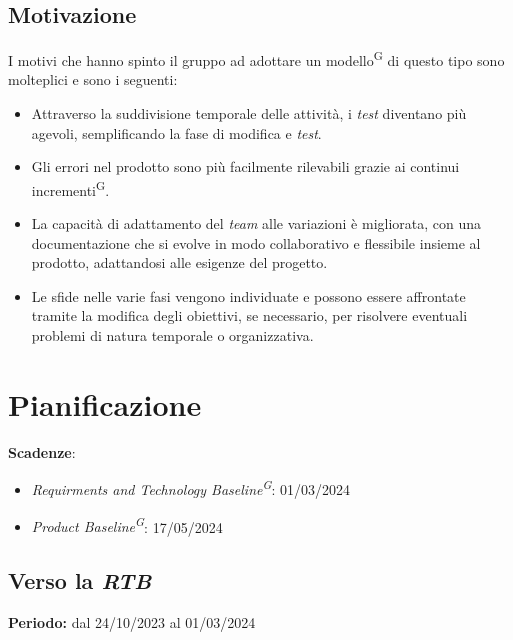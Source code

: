 \documentclass[5pt]{article}
\begin{document}
\subsection{Motivazione}
I motivi che hanno spinto il gruppo ad adottare un modello\textsuperscript{G} di questo tipo sono molteplici e sono i seguenti:
\begin{itemize}
    \item Attraverso la suddivisione temporale delle attività, i \textit{test} diventano più agevoli, semplificando la fase di modifica e \textit{test}.
    \item Gli errori nel prodotto sono più facilmente rilevabili grazie ai continui incrementi\textsuperscript{G}.
    \item La capacità di adattamento del \textit{team} alle variazioni è migliorata, con una documentazione che si evolve in modo collaborativo e flessibile insieme al prodotto, adattandosi alle esigenze del progetto.
    \item Le sfide nelle varie fasi vengono individuate e possono essere affrontate tramite la modifica degli obiettivi, se necessario, per risolvere eventuali problemi di natura temporale o organizzativa.
\end{itemize}


\section{Pianificazione}
\textbf{Scadenze}:
\begin{itemize}
    \item \textit{Requirments and Technology Baseline\textsuperscript{G}}: 01/03/2024
    \item \textit{Product Baseline\textsuperscript{G}}: 17/05/2024
\end{itemize}

\subsection{Verso la \textit{RTB}}
\textbf{Periodo:} dal 24/10/2023 al 01/03/2024
\end{document}
